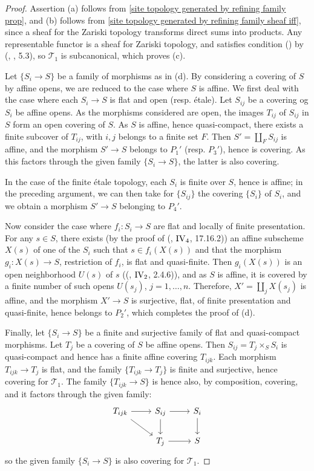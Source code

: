 \begin{proof}
Assertion (a) follows from \cref{site topology generated by refining family prop}, and (b) follows from \cref{site topology generated by refining family sheaf iff}, since a sheaf for the Zariski topology transforms direct sums into products. Any representable functor is a sheaf for Zariski topology, and satisfies condition () by (\cite{SGA1}, , 5.3), so $\mathcal{T}_1$ is subcanonical, which proves (c).\par
Let $\{S_i\to S\}$ be a family of morphisms as in (d). By considering a covering of $S$ by affine opens, we are reduced to the case where $S$ is affine. We first deal with the case where each $S_i\to S$ is flat and open (resp. \'etale). Let $S_{ij}$ be a covering og $S_i$ be affine opens. As the morphisms considered are open, the images $T_{ij}$ of $S_{ij}$ in $S$ form an open covering of $S$. As $S$ is affine, hence quasi-compact, there exists a finite subcover of $T_{ij}$, with $i,j$ belongs to a finite set $F$. Then $S'=\coprod_FS_{ij}$ is affine, and the morphism $S'\to S$ belongs to $P_1'$ (resp. $P_3'$), hence is covering. As this factors through the given family $\{S_i\to S\}$, the latter is also covering.\par
In the case of the finite \'etale topology, each $S_i$ is finite over $S$, hence is affine; in the preceding argument, we can then take for $\{S_{ij}\}$ the covering $\{S_i\}$ of $S_i$, and we obtain a morphism $S'\to S$ belonging to $P_4'$.\par
Now consider the case where $f_i:S_i\to S$ are flat and locally of finite presentation. For any $s\in S$, there exists (by the proof of (\cite{EGA4}, $\text{\Rmnum{4}}_4$, 17.16.2)) an affine subscheme $X(s)$ of one of the $S_i$ such that $s\in f_i(X(s))$ and that the morphism $g_i:X(s)\to S$, restriction of $f_i$, is flat and quasi-finite. Then $g_i(X(s))$ is an open neighborhood $U(s)$ of $s$ ((\cite{EGA4}, $\text{\Rmnum{4}}_2$, 2.4.6)), and as $S$ is affine, it is covered by a finite number of such opens $U(s_j)$, $j=1,\dots,n$. Therefore, $X'=\coprod_jX(s_j)$ is affine, and the morphism $X'\to S$ is surjective, flat, of finite presentation and quasi-finite, hence belongs to $P_2'$, which completes the proof of (d).\par
Finally, let $\{S_i\to S\}$ be a finite and surjective family of flat and quasi-compact morphisms. Let $T_j$ be a covering of $S$ be affine opens. Then $S_{ij}=T_j\times_SS_i$ is quasi-compact and hence has a finite affine covering $T_{ijk}$. Each morphism $T_{ijk}\to T_j$ is flat, and the family $\{T_{ijk}\to T_j\}$ is finite and surjective, hence covering for $\mathcal{T}_1$. The family $\{T_{ijk}\to S\}$ is hence also, by composition, covering, and it factors through the given family:
\[\begin{tikzcd}
T_{ijk}\ar[rd]\ar[r]&S_{ij}\ar[d]\ar[r]&S_i\ar[d]\\
&T_j\ar[r]&S
\end{tikzcd}\]
so the given family $\{S_i\to S\}$ is also covering for $\mathcal{T}_1$.
\end{proof}

